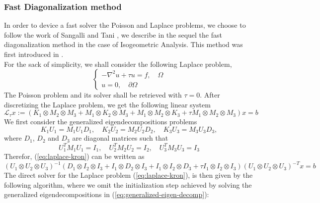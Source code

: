 \subsubsection{Fast Diagonalization method}
In order to device a fast solver the Poisson and Laplace problems, we choose to follow the work of Sangalli and Tani \cite{sangalli2016}, we describe in the sequel the fast diagonalization method in the case of Isogeometric Analysis. This method was first introduced in \cite{lynch1964}.
\\
For the sack of simplicity, we shall consider the following Laplace problem, 
\begin{equation}
  \begin{cases}
  - \nabla^2 u + \tau u = f, \quad \Omega \\ 
  u=0, \quad \partial\Omega
  \end{cases}
  \label{eq:laplace}
\end{equation}
The Poisson problem and its solver shall be retrieved with $\tau=0$.
After discretizing the Laplace problem, we get the following linear system
\begin{equation}
  \mathcal{L}_{\tau} x := \left( K_1 \otimes M_2 \otimes M_3 +  M_1 \otimes K_2 \otimes M_3 + M_1 \otimes M_2 \otimes K_3 + \tau M_1 \otimes M_2 \otimes M_3 \right) x = b 
  \label{eq:laplace-kron}
\end{equation}
We first consider the generalized eigendecompositions problems
\begin{equation}
  K_1 U_1 = M_1 U_1 D_1, \quad  
  K_2 U_2 = M_2 U_2 D_2, \quad 
  K_3 U_3 = M_3 U_3 D_3,
  \label{eq:generalized-eigen-decomp}
\end{equation}
where $D_1$, $D_2$ and $D_3$ are diagonal matrices such that
\begin{equation}
  U_1^T M_1 U_1 = I_1, \quad  
  U_2^T M_2 U_2 = I_2, \quad  
  U_3^T M_3 U_3 = I_3
\end{equation}
Therefor, (\ref{eq:laplace-kron}) can be written as
\begin{equation}
  \left( U_1 \otimes U_2 \otimes U_3 \right)^{-1} 
  \left( D_1 \otimes I_2 \otimes I_3 +  I_1 \otimes D_2 \otimes I_3 + I_1 \otimes I_2 \otimes D_3 + \tau I_1 \otimes I_2 \otimes I_3 \right) 
  \left( U_1 \otimes U_2 \otimes U_3 \right)^{-T} 
  x = b 
  \label{eq:laplace-kron-fact}
\end{equation}
The direct solver for the Laplace problem (\ref{eq:laplace-kron}), is then given by the following algorithm, where we omit the initialization step achieved by solving the generalized eigendecompositions in (\ref{eq:generalized-eigen-decomp}):
